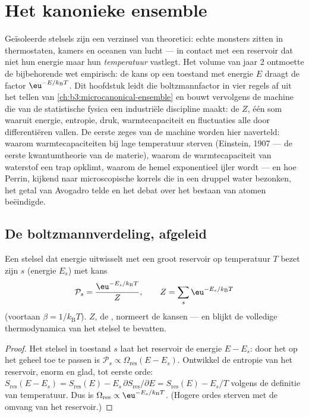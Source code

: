 \chapter{Het kanonieke ensemble}\label{ch:b3:canonical-ensemble}

Geïsoleerde stelsels zijn een verzinsel van theoretici: echte monsters
zitten in thermostaten, kamers en oceanen van lucht --- in contact met een
reservoir dat niet hun energie maar hun \emph{temperatuur} vastlegt. Het
volume van jaar 2 ontmoette de bijbehorende wet empirisch: de kans op een
toestand met energie $E$ draagt de factor $\eu^{-E/k_{\text{B}}T}$. Dit
hoofdstuk leidt die boltzmannfactor in vier regels af uit het tellen van
\cref{ch:b3:microcanonical-ensemble} en bouwt vervolgens de machine die
van de statistische fysica een industriële discipline maakt: de
\emph{} $Z$, één som waaruit energie, entropie, druk,
warmtecapaciteit en fluctuaties alle door differentiëren vallen. De eerste
zeges van de machine worden hier naverteld: waarom warmtecapaciteiten bij
lage temperatuur sterven (Einstein, 1907 --- de eerste kwantumtheorie van
de materie), waarom de warmtecapaciteit van waterstof een trap opklimt,
waarom de hemel exponentieel ijler wordt --- en hoe Perrin, kijkend naar
microscopische korrels die in een druppel water bezonken, het getal van
Avogadro telde en het debat over het bestaan van atomen beëindigde.

\section{De boltzmannverdeling, afgeleid}

\begin{theorem}\label{thm:b3:canonical-ensemble:boltzmann}
Een stelsel dat energie uitwisselt met een groot reservoir op temperatuur
$T$ bezet zijn  $s$ (energie $E_s$) met kans
\[
\mathcal P_s = \frac{\eu^{-E_s/k_{\text{B}}T}}{Z} , \qquad
Z = \sum_s \eu^{-E_s/k_{\text{B}}T}
\]
(voortaan $\beta = 1/k_{\text{B}}T$). $Z$, de \emph{},
normeert de kansen --- en blijkt de volledige thermodynamica van het
stelsel te bevatten.
\end{theorem}

\begin{proof}
Het stelsel in toestand $s$ laat het reservoir de energie $E - E_s$: door
het  op het geheel toe te passen is $\mathcal P_s
\propto \Omega_{\text{res}}(E - E_s)$. Ontwikkel de entropie van het reservoir,
enorm en glad, tot eerste orde: $S_{\text{res}}(E - E_s)
= S_{\text{res}}(E) - E_s\,\partial S_{\text{res}}/\partial E =
S_{\text{res}}(E) - E_s/T$ volgens de definitie van temperatuur. Dus is
$\Omega_{\text{res}} \propto \eu^{-E_s/k_{\text{B}}T}$. (Hogere ordes
sterven met de omvang van het reservoir.)
\end{proof}

